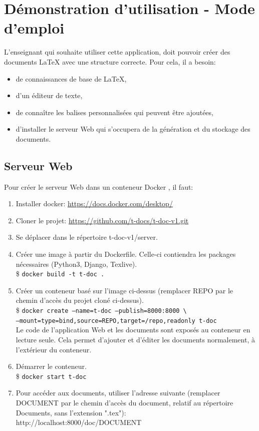 \documentclass[12pt,titlepage,oneside]{article}
\renewcommand{\cite}[1]{}
\begin{document}
\newpage

\section{Démonstration d'utilisation - Mode d'emploi}
L'enseignant qui souhaite utiliser cette application, doit pouvoir créer des documents LaTeX avec une structure correcte. Pour cela, il a besoin:
\begin{itemize}
\item de connaissances de base de LaTeX,
\item d'un éditeur de texte,
\item de connaître les balises personnalisées qui peuvent être ajoutées,
\item d'installer le serveur Web qui s'occupera de la génération et du stockage des documents.
\end{itemize}

\subsection{Serveur Web}
Pour créer le serveur Web dans un conteneur Docker \cite{docker}, il faut:
\begin{enumerate}
  \item Installer docker: \url{https://docs.docker.com/desktop/}
  \item Cloner le projet: \url{https://github.com/t-docs/t-doc-v1.git}
  \item Se déplacer dans le répertoire t-doc-v1/server.
  \item Créer une image à partir du Dockerfile. Celle-ci contiendra les packages nécessaires (Python3, Django, Texlive).\\
  \$ \texttt{docker build -t t-doc .}
  \item Créer un conteneur basé sur l'image ci-dessus (remplacer REPO par le chemin d'accès du projet cloné ci-dessus).\\
  \$ \texttt{docker create --name=t-doc --publish=8000:8000 \textbackslash\\
  --mount=type=bind,source=REPO,target=/repo,readonly t-doc}\\
  Le code de l'application Web et les documents sont exposés au conteneur en lecture seule. Cela permet d'ajouter et d'éditer les documents normalement, à l'extérieur du conteneur.
  \item Démarrer le conteneur.\\
  \$ \texttt{docker start t-doc}
  \item Pour accéder aux documents, utiliser l'adresse suivante (remplacer DOCUMENT par le chemin d'accès du document, relatif au répertoire Documents, sans l'extension ".tex"):\\
  http://localhost:8000/doc/DOCUMENT
\end{enumerate}
\end{document}
